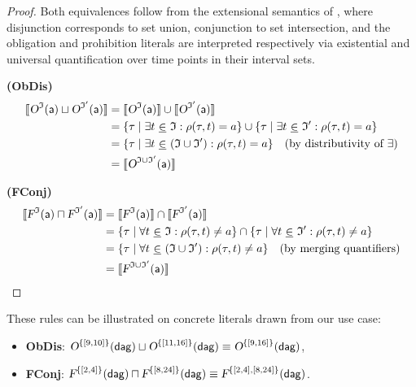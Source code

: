 \begin{proof}
Both equivalences follow from the extensional semantics of \TDDLfm, where disjunction corresponds to set union, conjunction to set intersection, and the obligation and prohibition literals are interpreted respectively via existential and universal quantification over time points in their interval sets.

\textbf{(ObDis)}  
\begin{align*}
\llbracket \textsl{O}^{\mathfrak{I}}(\mathsf{a}) \sqcup \textsl{O}^{\mathfrak{I}'}(\mathsf{a}) \rrbracket 
&= \llbracket \textsl{O}^{\mathfrak{I}}(\mathsf{a}) \rrbracket \cup \llbracket \textsl{O}^{\mathfrak{I}'}(\mathsf{a}) \rrbracket \\
&= \{\tau \mid \exists t ~\underline{\in}~ \mathfrak{I} : \rho(\tau,t) = a \} \cup \{\tau \mid \exists t ~\underline{\in}~ \mathfrak{I}' : \rho(\tau,t) = a \} \\
&= \{\tau \mid \exists t ~\underline{\in}~ (\mathfrak{I} \cup \mathfrak{I}') : \rho(\tau,t) = a \} 
\quad \text{(by distributivity of $\exists$)} \\
&= \llbracket \textsl{O}^{\mathfrak{I} \cup \mathfrak{I}'}(\mathsf{a}) \rrbracket
\end{align*}

\textbf{(FConj)}  
\begin{align*}
\llbracket \textsl{F}^{\mathfrak{I}}(\mathsf{a}) \sqcap \textsl{F}^{\mathfrak{I}'}(\mathsf{a}) \rrbracket 
&= \llbracket \textsl{F}^{\mathfrak{I}}(\mathsf{a}) \rrbracket \cap \llbracket \textsl{F}^{\mathfrak{I}'}(\mathsf{a}) \rrbracket \\
&= \{\tau \mid \forall t ~\underline{\in}~ \mathfrak{I} : \rho(\tau,t) \neq a \} \cap \{\tau \mid \forall t ~\underline{\in}~ \mathfrak{I}' : \rho(\tau,t) \neq a \} \\
&= \{\tau \mid \forall t ~\underline{\in}~ (\mathfrak{I} \cup \mathfrak{I}') : \rho(\tau,t) \neq a \} 
\quad \text{(by merging quantifiers)} \\
&= \llbracket \textsl{F}^{\mathfrak{I} \cup \mathfrak{I}'}(\mathsf{a}) \rrbracket
\end{align*}
\end{proof}


\begin{example}
These rules can be illustrated on concrete literals drawn from our use case:
\begin{itemize}
\item \textbf{ObDis}: $\textsl{O}^{\{[9,10]\}}(\mathsf{\mathsf{dag}}) \sqcup \textsl{O}^{\{[11,16]\}}(\mathsf{\mathsf{dag}}) \equiv  \textsl{O}^{\{[9,16]\}}(\mathsf{\mathsf{dag}})$,
\item \textbf{FConj}: $\textsl{F}^{\{[2,4]\}}(\mathsf{\mathsf{dag}}) \sqcap \textsl{F}^{\{[8,24]\}}(\mathsf{\mathsf{dag}}) \equiv  \textsl{F}^{\{[2,4],[8,24]\}}(\mathsf{\mathsf{dag}})$.
\end{itemize}
\end{example}


